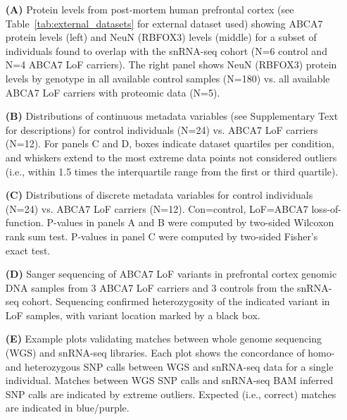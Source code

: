 \documentclass[12pt]{article}
\begin{document}
\begin{itemize}
    \item[\textbf{(A)}] Protein levels from post-mortem human prefrontal cortex (see Table~\ref{tab:external_datasets} for external dataset used) showing ABCA7 protein levels (left) and NeuN (RBFOX3) levels (middle) for a subset of individuals found to overlap with the snRNA-seq cohort (N=6 control and N=4 ABCA7 LoF carriers). The right panel shows NeuN (RBFOX3) protein levels by genotype in all available control samples (N=180) vs. all available ABCA7 LoF carriers with proteomic data (N=5).
    \item[\textbf{(B)}] Distributions of continuous metadata variables (see Supplementary Text for descriptions) for control individuals (N=24) vs. ABCA7 LoF carriers (N=12). For panels C and D, boxes indicate dataset quartiles per condition, and whiskers extend to the most extreme data points not considered outliers (i.e., within 1.5 times the interquartile range from the first or third quartile). 
    \item[\textbf{(C)}] Distributions of discrete metadata variables for control individuals (N=24) vs. ABCA7 LoF carriers (N=12). Con=control, LoF=ABCA7 loss-of-function. P-values in panels A and B were computed by two-sided Wilcoxon rank sum test. P-values in panel C were computed by two-sided Fisher’s exact test.
    \item[\textbf{(D)}] Sanger sequencing of ABCA7 LoF variants in prefrontal cortex genomic DNA samples from 3 ABCA7 LoF carriers and 3 controls from the snRNA-seq cohort. Sequencing confirmed heterozygosity of the indicated variant in LoF samples, with variant location marked by a black box. 
    \item[\textbf{(E)}] Example plots validating matches between whole genome sequencing (WGS) and snRNA-seq libraries. Each plot shows the concordance of homo- and heterozygous SNP calls between WGS and snRNA-seq data for a single individual. Matches between WGS SNP calls and snRNA-seq BAM inferred SNP calls are indicated by extreme outliers. Expected (i.e., correct) matches are indicated in blue/purple. 
\end{itemize} \clearpage
\end{document}
